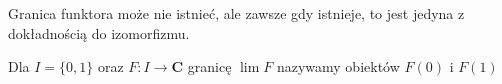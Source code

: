 Granica funktora może nie istnieć, ale zawsze gdy istnieje, to jest jedyna z dokładnością do izomorfizmu.

\begin{example}
  \item Dla $I=\{0,1\}$ oraz $F:I\to \mathbf{C}$ granicę $\lim F$ nazywamy  obiektów $F(0)$ i $F(1)$
    \begin{center}\end{center}
\end{example}

\begin{definition} 
\end{definition}
